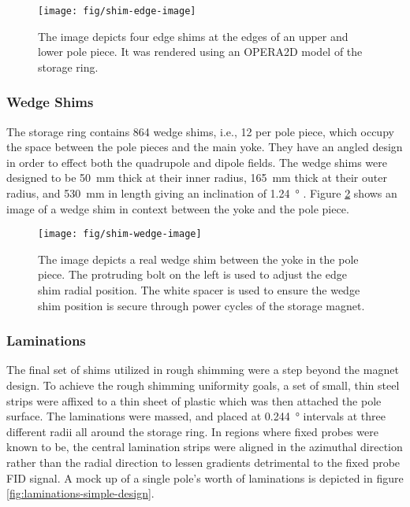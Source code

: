 \begin{figure}[h]
\centering
\texttt{[image: fig/shim-edge-image]}
\caption{
    The image depicts four edge shims at the edges of an upper and lower pole piece.  It was rendered using an OPERA2D model of the storage ring. 
    \label{fig:shim-edge-image}
}
\end{figure}

\subsubsection{Wedge Shims}
The storage ring contains 864 wedge shims, i.e., 12 per pole piece, which occupy the space between the pole pieces and the main yoke.  They have an angled design in order to effect both the quadrupole and dipole fields.  The wedge shims were designed to be \SI{50}{\mm} thick at their inner radius, \SI{165}{\mm} thick at their outer radius, and \SI{530}{\mm} in length giving an inclination of \SI{1.24}{\degree} \cite{danby-magnet}.  Figure \ref{fig:shim-wedge-image} shows an image of a wedge shim in context between the yoke and the pole piece.

\begin{figure}[h]
\centering
\texttt{[image: fig/shim-wedge-image]}
\caption{
    The image depicts a real wedge shim between the yoke in the pole piece.  The protruding bolt on the left is used to adjust the edge shim radial position.  The white spacer is used to ensure the wedge shim position is secure through power cycles of the storage magnet.
    \label{fig:shim-wedge-image}
}
\end{figure}

\subsubsection{Laminations}
The final set of shims utilized in rough shimming were a step beyond the magnet design.  To achieve the rough shimming uniformity goals, a set of small, thin steel strips were affixed to a thin sheet of plastic which was then attached the pole surface.  The laminations were massed, and placed at \SI{0.244}{\degree} intervals at three different radii all around the storage ring.  In regions where fixed probes were known to be, the central lamination strips were aligned in the azimuthal direction rather than the radial direction to lessen gradients detrimental to the fixed probe FID signal.  A mock up of a single pole's worth of laminations is depicted in figure \ref{fig:laminations-simple-design}.


